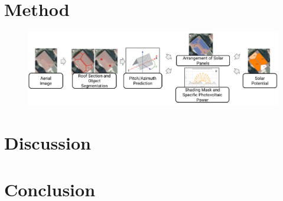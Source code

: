 \documentclass{article} %
\begin{document}
\section*{Method}


\begin{figure}
	\centering
	\includegraphics[width=\linewidth]{../figures/fig_1.pdf}
\end{figure}






\section*{Discussion}


\section*{Conclusion}


\newpage



\end{document}
